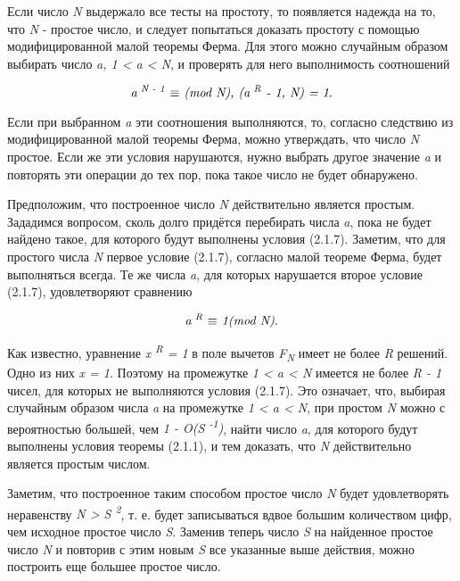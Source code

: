 Если число \textit{N} выдержало все тесты на простоту, то появляется надежда на то, что \textit{N} - простое число, и следует попытаться 
доказать простоту с помощью модифицированной малой теоремы Ферма. Для этого можно случайным образом выбирать число \textit{a, 1 < a < N},
и проверять для него выполнимость соотношений

  \begin{equation}
    \textit{a\textsuperscript{ N - 1} {$\equiv$} (mod N), (a\textsuperscript{ R} - 1, N) = 1}.
  \end{equation}
  
  Если при выбранном \textit{a} эти соотношения выполняются, то, согласно следствию из модифицированной малой теоремы Ферма, можно 
утверждать, что число \textit{N} простое. Если же эти условия нарушаются, нужно выбрать другое значение \textit{a} и повторять 
эти операции до тех пор, пока такое число не будет обнаружено.

  Предположим, что построенное число \textit{N} действительно является простым. Зададимся вопросом, сколь долго придётся 
перебирать числа \textit{a}, пока не будет найдено такое, для которого будут выполнены условия (2.1.7). Заметим, что для простого числа \textit{N}
первое условие (2.1.7), согласно малой теореме Ферма, будет выполняться всегда. Те же числа \textit{a}, для которых нарушается второе 
условие (2.1.7), удовлетворяют сравнению

  \begin{equation}
   \textit{a\textsuperscript{ R} {$\equiv$} 1(mod N)}.
  \end{equation}

Как известно, уравнение \textit{x\textsuperscript{ R} = 1} в поле вычетов \textit{F\textsubscript{N}} имеет не более \textit{R} решений. 
Одно из них \textit{x = 1}. Поэтому на промежутке \textit{1 < a < N} имеется не более \textit{R - 1} чисел, для которых не выполняются 
условия (2.1.7). Это означает, что, выбирая случайным образом числа \textit{a} на промежутке \textit{1 < a < N}, при простом \textit{N}
можно с вероятностью большей, чем \textit{1 - O(S\textsuperscript{ -1})}, найти число \textit{a}, для которого будут выполнены условия 
теоремы (2.1.1), и тем доказать, что \textit{N} действительно является простым числом.

  Заметим, что построенное таким способом простое число \textit{N} будет удовлетворять неравенству \textit{N > S\textsuperscript{ 2}}, 
т. е. будет записываться вдвое большим количеством цифр, чем исходное простое число \textit{S}. Заменив теперь число \textit{S} на 
найденное простое число \textit{N} и повторив с этим новым \textit{S} все указанные выше действия, можно построить еще большее простое 
число.

